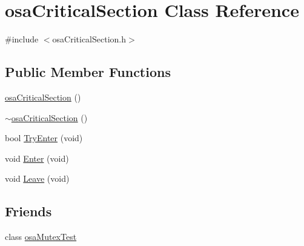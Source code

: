 \hypertarget{classosa_critical_section}{\section{osa\-Critical\-Section Class Reference}
\label{classosa_critical_section}
}


{\ttfamily \#include $<$osa\-Critical\-Section.\-h$>$}

\subsection*{Public Member Functions}
\begin{DoxyCompactItemize}
\item 
\hyperlink{classosa_critical_section_ae16dc0b380496fb7e9cd8a850254ee2a}{osa\-Critical\-Section} ()
\item 
\hyperlink{classosa_critical_section_a2c8b6e77657f9f9bb2035ec0bbe2c8e2}{$\sim$osa\-Critical\-Section} ()
\item 
bool \hyperlink{classosa_critical_section_adef15d3ea3d023c954d645638f377893}{Try\-Enter} (void)
\item 
void \hyperlink{classosa_critical_section_a27127ad5dd0b7abcb52fe7bf2ee36f64}{Enter} (void)
\item 
void \hyperlink{classosa_critical_section_a44eb5213cf9267f20bfcfa7a3b50dfc0}{Leave} (void)
\end{DoxyCompactItemize}
\subsection*{Friends}
\begin{DoxyCompactItemize}
\item 
class \hyperlink{classosa_critical_section_a5de70802de08aa05e0bf7bdbad8bd9cc}{osa\-Mutex\-Test}
\end{DoxyCompactItemize}


